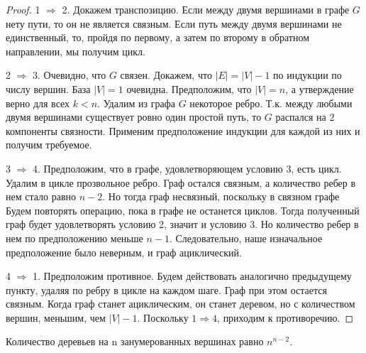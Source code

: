 \begin{proof}
	\;
	
	1 $\Rightarrow$ 2. 
	Докажем транспозицию.
	Если между двумя вершинами в графе $G$ нету пути, то он не является связным. Если путь между двумя вершинами не единственный, то, пройдя по первому, а затем по второму в обратном  направлении, мы получим цикл.
	
	2 $\Rightarrow $ 3.
	Очевидно, что $G$ связен. Докажем, что $|E|=|V| - 1$ по индукции по числу вершин. База $|V|=1$ очевидна. Предположим, что $|V|=n$, а утверждение верно для всех $k < n$. Удалим из
	графа $G$ некоторое ребро. Т.к. между любыми двумя вершинами существует ровно один простой путь, то $G$ распался на 2 компоненты связности. Применим предположение индукции для каждой из них и получим требуемое.
	
	3 $\Rightarrow $ 4.
	Предположим, что в графе, удовлетворяющем условию 3, есть цикл. Удалим в цикле прозвольное ребро. Граф остался связным, а количество ребер в нем стало равно $n-2$. Но тогда граф несвязный, поскольку в связном графе Будем повторять операцию, пока в графе не останется циклов. Тогда полученный граф будет удовлетворять условию 2, значит и условию 3. Но количество ребер в нем по предположению меньше $n - 1$. Следовательно, наше изначальное предположение было неверным, и граф ациклический.
	
	4 $\Rightarrow $ 1.
	Предположим противное. Будем действовать аналогично предыдущему пункту, удаляя по ребру в цикле на каждом шаге. Граф при этом остается связным. Когда граф станет ациклическим, он станет деревом, но с количеством вершин, меньшим, чем $|V| - 1$. Поскольку $1 \Rightarrow 4$, приходим к противоречию.
\end{proof}

\begin{theorem}[Кэли] \label{Caley}
	Количество деревьев на n занумерованных вершинах равно $n^{n - 2}$.
\end{theorem}


